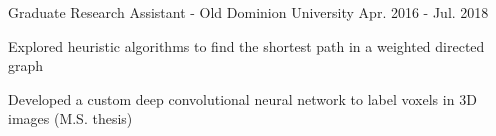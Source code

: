 \begin{cventries}
    \vspace{4mm}
    \cventryp
        {}
        {Graduate Research Assistant - Old Dominion University}
        {Apr. 2016 - Jul. 2018}
        {}
        {
          \begin{cvitems}
            \item {Explored heuristic algorithms to find the shortest path in a weighted directed graph}
            \vspace{1mm}
            \item {Developed a custom deep convolutional neural network to label voxels in 3D images (M.S. thesis)}
          \end{cvitems}
        }
    



\end{cventries}
